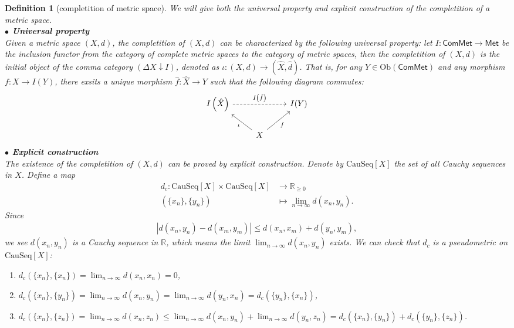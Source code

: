 \documentclass{report}
\newtheorem{definition}{Definition}[section]
\theoremstyle{nonumberplain}
\begin{document}
\begin{definition}[completition of metric space]
	We will give both the universal property and explicit construction of the completition of a metric space.\\
	\textbf{$\bullet$ Universal property}\\
	Given a metric space $(X,d)$, the \emph{completition} of $(X,d)$ can be characterized by the following universal property: let $I: \mathsf{ComMet}\to\mathsf{Met}$ be the inclusion functor from the category of complete metric spaces to the category of metric spaces, then the \emph{completition of $(X,d)$} is the initial object of the comma category $\left(\Delta X\downarrow I\right)$, denoted as $\iota:(X,d)\to\left(\hat{X},\hat{d}\right)$. That is, for any $Y\in\mathrm{Ob}(\mathsf{ComMet})$ and any morphism $f:X\to I(Y)$, there exsits a unique morphism $\hat{f}:\hat{X}\to Y$ such that the following diagram commutes:
	\[
		\begin{tikzcd}
			I\left(\hat{X}\right) \arrow[rr, "I\left(\hat{f}\right)", dashed] &                                        & I(Y) \\
																			  & X \arrow[lu, "\iota"] \arrow[ru, "f"'] &     
	\end{tikzcd}
	\]
	\textbf{$\bullet$ Explicit construction}\\
	The existence of the completition of $(X,d)$ can be proved by explicit construction. Denote by $\mathrm{CauSeq}[X]$ the set of all Cauchy sequences in $X$. Define a map
	\begin{align*}
		d_c:\mathrm{CauSeq}[X]\times\mathrm{CauSeq}[X]&\longrightarrow\mathbb{R}_{\ge 0}\\
		\left(\{x_n\},\{y_n\}\right)&\longmapsto\lim_{n\to\infty}d(x_n,y_n).
	\end{align*}
	Since 
	\begin{align*}
		|d(x_n,y_n)-d(x_m,y_m)|\le d(x_n,x_m)+d(y_n,y_m),
	\end{align*}
    we see $d(x_n,y_n)$ is a Cauchy sequence in $\mathbb{R}$, which means the limit $\lim_{n\to\infty}d(x_n,y_n)$ exists. We can check that $d_c$ is a pseudometric on $\mathrm{CauSeq}[X]$:
	\begin{enumerate}
		\item $d_c(\{x_n\},\{x_n\})=\lim_{n\to\infty}d(x_n,x_n)=0$,
		\item $d_c(\{x_n\},\{y_n\})=\lim_{n\to\infty}d(x_n,y_n)=\lim_{n\to\infty}d(y_n,x_n)=d_c(\{y_n\},\{x_n\})$,
		\item $d_c(\{x_n\},\{z_n\})=\lim_{n\to\infty}d(x_n,z_n)\le\lim_{n\to\infty}d(x_n,y_n)+\lim_{n\to\infty}d(y_n,z_n)=d_c(\{x_n\},\{y_n\})+d_c(\{y_n\},\{z_n\})$.

\end{enumerate}
\end{definition}
\end{document}
